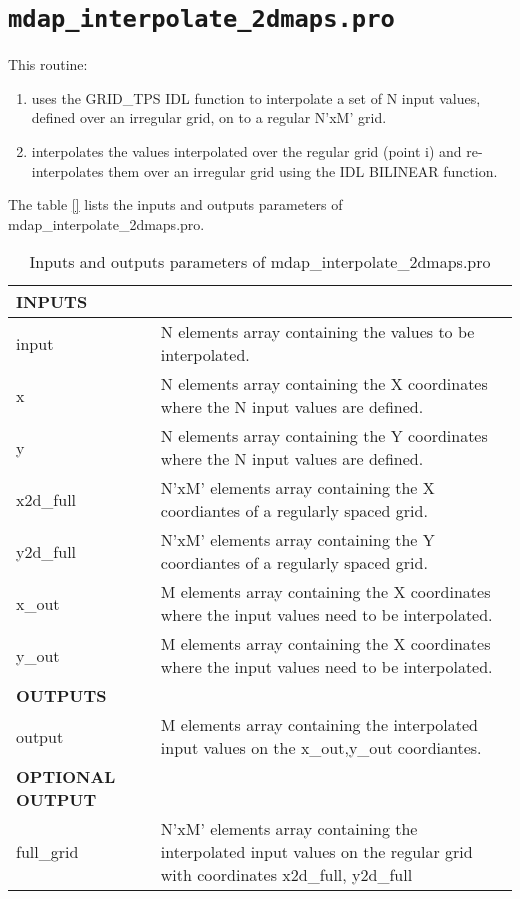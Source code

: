 \section{{\tt mdap\_interpolate\_2dmaps.pro}}
\label{dap_sec:mdap_interpolate_2dmaps}


This routine: 
\begin{enumerate}

\item uses the GRID\_TPS IDL function to interpolate a set of N input
  values, defined over an irregular grid, on to a regular N'xM' grid.
\item interpolates the values interpolated over the regular grid
  (point i) and re-interpolates them over an irregular grid using the
  IDL BILINEAR function.
\end{enumerate}

The table \ref{} lists the inputs and outputs parameters of mdap\_interpolate\_2dmaps.pro.


\begin{center}
\begin{longtable}{p{2.7cm}| p{11.1cm}}
\caption{Inputs and outputs  parameters of mdap\_interpolate\_2dmaps.pro} \label{dap_tab:mdap_interpolate_2dmaps} \\
\hline
{\bf  INPUTS} & \\
\hline
\endfirsthead
\hline
\endhead
\hline
\endlastfoot
\hline
 input &  N elements array containing the values to be interpolated. \\
%
 x    &   N elements array containing the X coordinates where the N input values are defined.\\
%
 y    &   N elements array containing the Y coordinates where the N input values are defined.\\
%
 x2d\_full & N'xM' elements array containing the X coordiantes of a regularly spaced grid.\\
%
 y2d\_full & N'xM' elements array containing the Y coordiantes of a regularly spaced grid.\\
%
 x\_out &M elements array containing the X coordinates where the input values need to be interpolated.\\
%
 y\_out &M elements array containing the X coordinates where the input values need to be interpolated.\\
%
\hline
{\bf  OUTPUTS} & \\
\hline
 output & M elements array containing the interpolated input values on the x\_out,y\_out coordiantes.\\
\hline
{\bf   OPTIONAL OUTPUT} & \\
 full\_grid  & N'xM' elements array containing the interpolated input values on the regular grid with coordinates x2d\_full, y2d\_full \\
\hline
\end{longtable}
\end{center}



